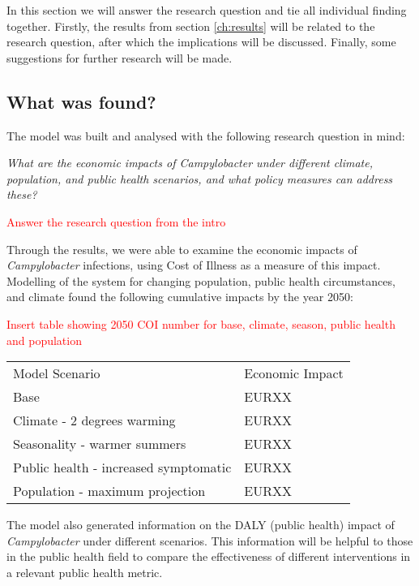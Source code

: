 In this section we will answer the research question and tie all individual finding together. Firstly, the results from section \ref{ch:results} will be related to the research question, after which the implications will be discussed. Finally, some suggestions for further research will be made. 

\subsection{What was found?}

The model was built and analysed with the following research question in mind: 

\begin{center}\textit{\textcolor{NiceBlue}{
What are the economic impacts of Campylobacter under different climate, population, and public health scenarios, and what policy measures can address these? }}
\end{center}


\textcolor{red}{Answer the research question from the intro}

Through the results, we were able to examine the economic impacts of \textit{Campylobacter} infections, using Cost of Illness as a measure of this impact. Modelling of the system for changing population, public health circumstances, and climate found the following cumulative impacts by the year 2050:

\textcolor{red}{Insert table showing 2050 COI number for base, climate, season, public health and population }
\begin{table}
\centering
\begin{tabular}{ll}
Model Scenario                        & Economic Impact  \\
Base                                  & EURXX            \\
Climate - 2 degrees warming           & EURXX            \\
Seasonality - warmer summers          & EURXX            \\
Public health - increased symptomatic & EURXX            \\
Population - maximum projection       & EURXX           
\end{tabular}
\end{table}

The model also generated information on the DALY (public health) impact of \textit{Campylobacter} under different scenarios. This information will be helpful to those in the public health field to compare the effectiveness of different interventions in a relevant public health metric.

